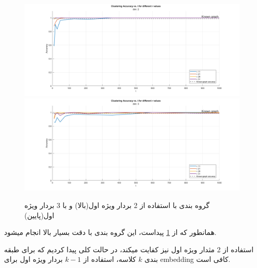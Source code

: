 \begin{figure}[h]
    \centering
    \includegraphics*[width=\linewidth]{../results/Q2/clustering.png}
    \includegraphics*[width=\linewidth]{../results/Q2/clustering-3d.png}
    \caption{گروه بندی با استفاده از 2 بردار ویژه اول(بالا) و با 3 بردار ویژه اول(پایین)}
    \label{fig:clustering}
\end{figure}

همانطور که از \ref*{fig:clustering} پیداست، این گروه بندی با دقت بسیار بالا انجام میشود.

استفاده از 2 مثدار ویژه اول نیز کفایت میکند، در حالت کلی پیدا کردیم که برای طبقه بندی $k$ کلاسه، 
استفاده از $k-1$ بردار ویژه اول برای embedding کافی است.